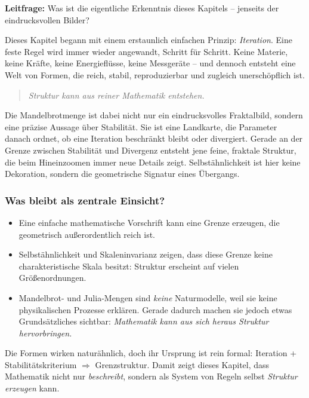 \textbf{Leitfrage:} Was ist die eigentliche Erkenntnis dieses Kapitels -- jenseits der eindrucksvollen Bilder?

Dieses Kapitel begann mit einem erstaunlich einfachen Prinzip:
\emph{Iteration}.
Eine feste Regel wird immer wieder angewandt, Schritt für Schritt.
Keine Materie, keine Kräfte, keine Energieflüsse, keine Messgeräte --
und dennoch entsteht eine Welt von Formen,
die reich, stabil, reproduzierbar
und zugleich unerschöpflich ist.

\begin{quote}
\emph{Struktur kann aus reiner Mathematik entstehen.}
\end{quote}

Die Mandelbrotmenge ist dabei nicht nur ein eindrucksvolles Fraktalbild,
sondern eine präzise Aussage über Stabilität.
Sie ist eine Landkarte,
die Parameter danach ordnet,
ob eine Iteration beschränkt bleibt oder divergiert.
Gerade an der Grenze zwischen Stabilität und Divergenz
entsteht jene feine, fraktale Struktur,
die beim Hineinzoomen immer neue Details zeigt.
Selbstähnlichkeit ist hier keine Dekoration,
sondern die geometrische Signatur eines Übergangs.

\subsubsection*{Was bleibt als zentrale Einsicht?}

\begin{itemize}
\item Eine einfache mathematische Vorschrift kann eine Grenze erzeugen, die geometrisch außerordentlich reich ist.
\item Selbstähnlichkeit und Skaleninvarianz zeigen, dass diese Grenze keine charakteristische Skala besitzt:
Struktur erscheint auf vielen Größenordnungen.
\item Mandelbrot- und Julia-Mengen sind \emph{keine} Naturmodelle, weil sie keine physikalischen Prozesse erklären.
Gerade dadurch machen sie jedoch etwas Grundsätzliches sichtbar:
\emph{Mathematik kann aus sich heraus Struktur hervorbringen.}
\end{itemize}

\begin{NoteBox}
\label{box:kernaussage}
\small
Die Formen wirken naturähnlich,
doch ihr Ursprung ist rein formal:
Iteration + Stabilitätskriterium $\Rightarrow$ Grenzstruktur.
Damit zeigt dieses Kapitel,
dass Mathematik nicht nur \emph{beschreibt},
sondern als System von Regeln selbst \emph{Struktur erzeugen} kann.
\end{NoteBox}

